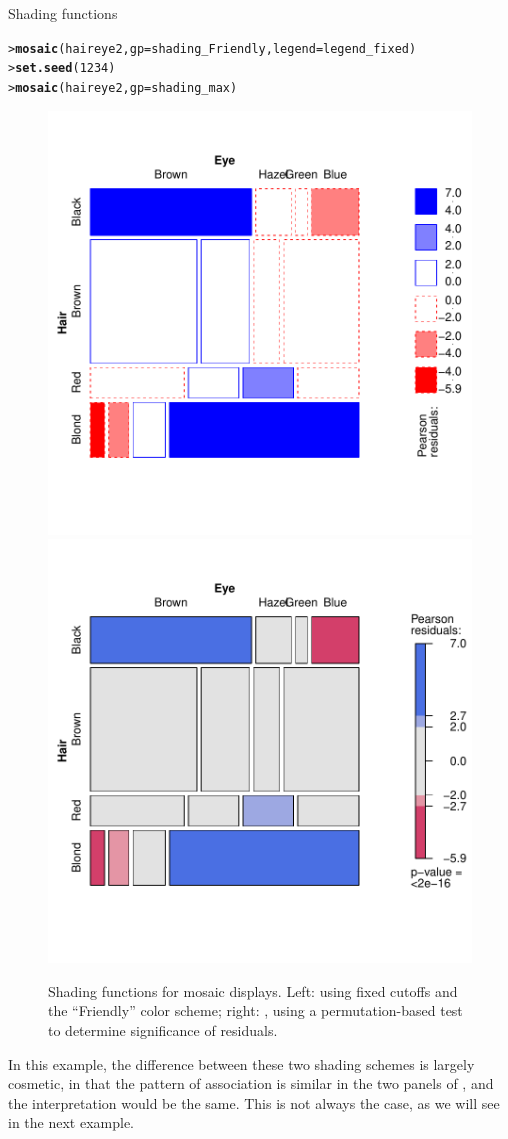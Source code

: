 \documentclass[10pt,krantz2]{krantz}\usepackage[]{graphicx}\usepackage[]{color}
\makeatletter
\newcommand{\hlnum}[1]{\textcolor[rgb]{0.686,0.059,0.569}{#1}}%
\newcommand{\hlstd}[1]{\textcolor[rgb]{0.345,0.345,0.345}{#1}}%
\newcommand{\hlkwc}[1]{\textcolor[rgb]{0.333,0.667,0.333}{#1}}%
\newcommand{\hlkwd}[1]{\textcolor[rgb]{0.737,0.353,0.396}{\textbf{#1}}}%
\newenvironment{kframe}{%
 \def\at@end@of@kframe{}%
 \ifinner\ifhmode%
  \def\at@end@of@kframe{\end{minipage}}%
  \begin{minipage}{\columnwidth}%
 \fi\fi%
 \def\FrameCommand##1{\hskip\@totalleftmargin \hskip-\fboxsep
 \colorbox{shadecolor}{##1}\hskip-\fboxsep
     \hskip-\linewidth \hskip-\@totalleftmargin \hskip\columnwidth}%
 \MakeFramed {\advance\hsize-\width
   \@totalleftmargin\z@ \linewidth\hsize
   \@setminipage}}%
 {\par\unskip\endMakeFramed%
 \at@end@of@kframe}
\newenvironment{knitrout}{}{} %
\renewenvironment{knitrout}{\small\renewcommand{\baselinestretch}{.85}}{} %
\makeatother
\begin{document}
\begin{Example}[shading]{Shading functions}
\begin{knitrout}
\color{fgcolor}\begin{kframe}
\begin{alltt}
\hlstd{> }\hlkwd{mosaic}\hlstd{(haireye2,} \hlkwc{gp} \hlstd{= shading_Friendly,} \hlkwc{legend} \hlstd{= legend_fixed)}
\hlstd{> }\hlkwd{set.seed}\hlstd{(}\hlnum{1234}\hlstd{)}
\hlstd{> }\hlkwd{mosaic}\hlstd{(haireye2,} \hlkwc{gp} \hlstd{= shading_max)}
\end{alltt}
\end{kframe}\begin{figure}[!htbp]

\centerline{\includegraphics[width=.49\textwidth]{ch05/fig/HE-shading-1} 
\includegraphics[width=.49\textwidth]{ch05/fig/HE-shading-2} }

\caption{Shading functions for mosaic displays. Left:  using fixed cutoffs and the ``Friendly'' color scheme; right: , using a permutation-based test to determine significance of residuals.}\label{fig:HE-shading}
\end{figure}


\end{knitrout}
In this example, the difference between these two shading schemes is largely cosmetic, in that
the pattern of association is similar in the two panels of , and the
interpretation would be the same.  This is not always the case, as we will see in the
next example.
\end{Example}
\end{document}

